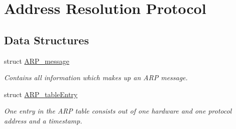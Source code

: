 \hypertarget{group__arp}{}\section{Address Resolution Protocol}
\label{group__arp}
\subsection*{Data Structures}
\begin{DoxyCompactItemize}
\item 
struct \mbox{\hyperlink{struct_a_r_p__message}{A\+R\+P\+\_\+message}}
\begin{DoxyCompactList}\small\item\em Contains all information which makes up an A\+RP message. \end{DoxyCompactList}\item 
struct \mbox{\hyperlink{struct_a_r_p__table_entry}{A\+R\+P\+\_\+table\+Entry}}
\begin{DoxyCompactList}\small\item\em One entry in the A\+RP table consists out of one hardware and one protocol address and a timestamp. \end{DoxyCompactList}\end{DoxyCompactItemize}
